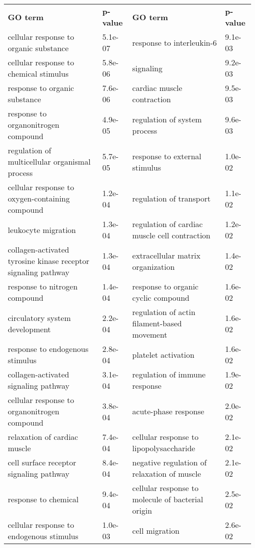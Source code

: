 \documentclass[fleqn,10pt]{SelfArx} %
\begin{document}
\begin{table}[!htb]
		\centering
		\scriptsize
		\begin{tabularx}{\textwidth}{XlXl}
		\rowcolor{NavyBlue!80}
		\textbf{\color{white} GO term} & \textbf{\color{white} p-value} & \textbf{\color{white} GO term} & \textbf{\color{white} p-value} \\
		cellular response to organic substance & 5.1e-07 & response to interleukin-6 & 9.1e-03 \\ 
		cellular response to chemical stimulus & 5.8e-06 & signaling & 9.2e-03 \\ 
		response to organic substance & 7.6e-06 & cardiac muscle contraction & 9.5e-03 \\ 
		response to organonitrogen compound & 4.9e-05 & regulation of system process & 9.6e-03 \\ 
		regulation of multicellular organismal process & 5.7e-05 & response to external stimulus & 1.0e-02 \\ 
		cellular response to oxygen-containing compound & 1.2e-04 & regulation of transport & 1.1e-02 \\ 
		leukocyte migration & 1.3e-04 & regulation of cardiac muscle cell contraction & 1.2e-02 \\ 
		collagen-activated tyrosine kinase receptor signaling pathway & 1.3e-04 & extracellular matrix organization & 1.4e-02 \\ 
		response to nitrogen compound & 1.4e-04 & response to organic cyclic compound & 1.6e-02 \\ 
		circulatory system development & 2.2e-04 & regulation of actin filament-based movement & 1.6e-02 \\ 
		response to endogenous stimulus & 2.8e-04 & platelet activation & 1.6e-02 \\ 
		collagen-activated signaling pathway & 3.1e-04 & regulation of immune response & 1.9e-02 \\ 
		cellular response to organonitrogen compound & 3.8e-04 & acute-phase response & 2.0e-02 \\ 
		relaxation of cardiac muscle & 7.4e-04 & cellular response to lipopolysaccharide & 2.1e-02 \\ 
		cell surface receptor signaling pathway & 8.4e-04 & negative regulation of relaxation of muscle & 2.1e-02 \\ 
		response to chemical & 9.4e-04 & cellular response to molecule of bacterial origin & 2.5e-02 \\ 
		cellular response to endogenous stimulus & 1.0e-03 & cell migration & 2.6e-02 \\ 

\end{tabularx}
\end{table}
\end{document}
